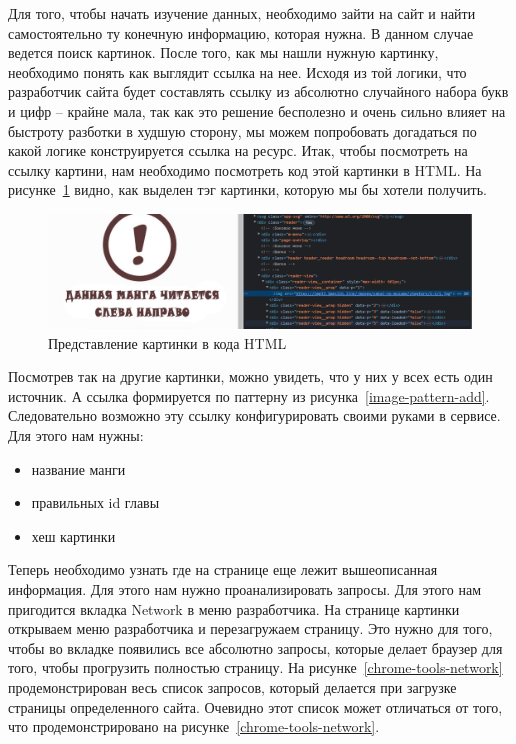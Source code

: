 Для того, чтобы начать изучение данных, необходимо зайти на сайт и найти самостоятельно ту конечную информацию, которая нужна. 
В данном случае ведется поиск картинок.
После того, как мы нашли нужную картинку, необходимо понять как выглядит ссылка на нее.
Исходя из той логики, что разработчик сайта будет составлять ссылку из абсолютно случайного набора букв и цифр -- крайне мала, так как это решение бесполезно и очень сильно влияет на быстроту разботки в худшую сторону,
мы можем попробовать догадаться по какой логике конструируется ссылка на ресурс. Итак, чтобы посмотреть на ссылку картини, нам необходимо посмотреть код этой картинки в HTML.
На рисунке~\ref{chrome-tools-image-tag-pic} видно, как выделен тэг картинки, которую мы бы хотели получить. 

\begin{figure}
    \includegraphics[scale=0.5]{imgs/chrome-tools-image-tag}
    \caption{Представление картинки в кода HTML}
    \label{chrome-tools-image-tag-pic}
\end{figure}

Посмотрев так на другие картинки, можно увидеть, что у них у всех есть один источник.
А ссылка формируется по паттерну из рисунка~\ref{image-pattern-add}. Следовательно возможно эту ссылку конфигурировать своими руками в сервисе.
Для этого нам нужны:

\begin{itemize}
    \item название манги
    \item правильных id главы
    \item хеш картинки
\end{itemize}

Теперь необходимо узнать где на странице еще лежит вышеописанная информация. Для этого нам нужно проанализировать запросы.
Для этого нам пригодится вкладка Network в меню разработчика.
На странице картинки открываем меню разработчика и перезагружаем страницу.
Это нужно для того, чтобы во вкладке появились все абсолютно запросы, которые делает браузер для того, чтобы прогрузить полностью страницу.
На рисунке~\ref{chrome-tools-network} продемонстрирован весь список запросов, который делается при загрузке страницы определенного сайта.
Очевидно этот список может отличаться от того, что продемонстрировано на рисунке~\ref{chrome-tools-network}.

